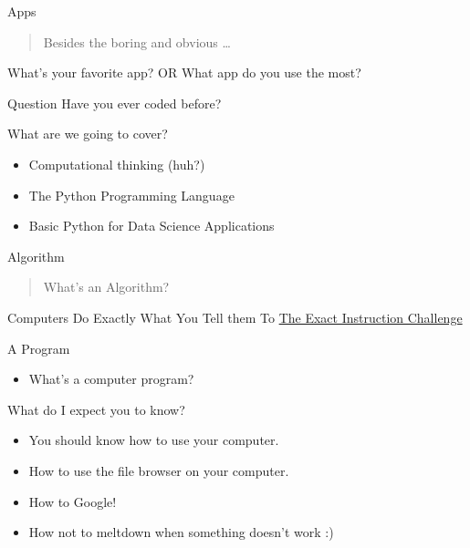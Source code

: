 \documentclass[
  11pt,
  ignorenonframetext,
]{beamer}
\providecommand{\tightlist}{%
  \setlength{\itemsep}{0pt}\setlength{\parskip}{0pt}}
\begin{document}
\begin{frame}{Apps}
\protect\hypertarget{apps}{}
\begin{quote}
Besides the boring and obvious \ldots{}
\end{quote}

What's your favorite app? OR What app do you use the most?
\end{frame}

\begin{frame}{Question}
\protect\hypertarget{question}{}
Have you ever coded before?

\end{frame}

\begin{frame}{What are we going to cover?}
\protect\hypertarget{what-are-we-going-to-cover}{}
\begin{itemize}
\tightlist
\item
  Computational thinking (huh?)
\item
  The Python Programming Language
\item
  Basic Python for Data Science Applications
\end{itemize}
\end{frame}

\begin{frame}{Algorithm}
\protect\hypertarget{algorithm}{}
\begin{quote}
What's an Algorithm?
\end{quote}
\end{frame}

\begin{frame}{Computers Do Exactly What You Tell them To}
\protect\hypertarget{computers-do-exactly-what-you-tell-them-to}{}
\href{https://www.youtube.com/watch?v=Ct-lOOUqmyY}{The Exact Instruction
Challenge}
\end{frame}

\begin{frame}{A Program}
\protect\hypertarget{a-program}{}
\begin{itemize}
\tightlist
\item
  What's a computer program?
\end{itemize}
\end{frame}

\begin{frame}{What do I expect you to know?}
\protect\hypertarget{what-do-i-expect-you-to-know}{}
\begin{itemize}
\tightlist
\item
  You should know how to use your computer.
\item
  How to use the file browser on your computer.
\item
  How to Google!
\item
  How not to meltdown when something doesn't work :)
\end{itemize}
\end{frame}
\end{document}
